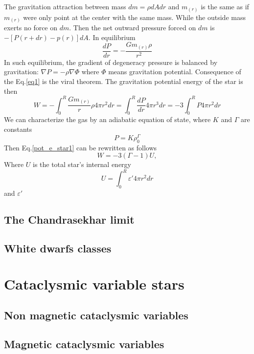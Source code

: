 \documentclass[oneside,a4paper,11pt]{report}
\begin{document}
The gravitation attraction between mass $dm = \rho dA dr$ and $m_{(r)}$ is the same as if $m_{(r)}$ were only point at the center with the same mass. While the outside mass exerts no force on $dm$.
Then the net outward pressure forced on $dm$ is $- \left [ P\left ( r + dr \right ) - p(r)  \right ]dA$. In equilibrium 
\begin{equation}
\label{eq1}
 \frac{dP}{dr} = - \frac{Gm_{(r)}\rho}{r^2}
\end{equation}
In such equilibrium, the gradient of degeneracy pressure is balanced by gravitation: $\nabla P = -\rho \nabla \Phi$ where $\Phi$ means gravitation potential.  
Consequence of the Eq.\eqref{eq1} is the viral theorem. The gravitation potential energy of the star is then 
\begin{equation}
\label{pot_e_star1}
W = -\int_{0}^{R} \frac{Gm_{(r)}}{r}\rho 4 \pi r^2 dr = \int_{0}^{R} \frac{dP}{dr}4\pi r^3 dr = -3\int_{0}^{R} P4 \pi r^2 dr
\end{equation}
We can characterize the gas by an adiabatic equation of state, where $K$ and $\Gamma$ are constants
\begin{equation}
 \label{adiab_1}
P = K\rho_0^\Gamma
\end{equation}
Then Eq.\eqref{pot_e_star1} can be rewritten as follows
\begin{equation}
 W = -3 (\Gamma - 1) U,
\end{equation}
Where $U$ is the total star's internal energy 
\begin{equation}
U = \int_{0}^{R}\varepsilon' 4\pi r^2 dr 
\end{equation}
and $\varepsilon'$   

\section{The Chandrasekhar limit}

\section{White dwarfs classes}

\chapter{Cataclysmic variable stars}
\section{Non magnetic cataclysmic variables} 
\section{Magnetic cataclysmic variables}
\end{document}
